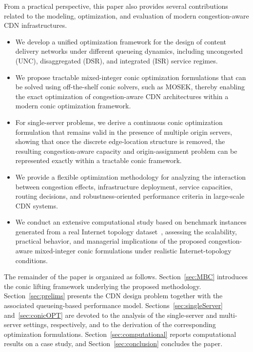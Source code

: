 \documentclass[a4paper,11pt,reqno]{amsart}
\begin{document}
From a practical perspective, this paper also provides several contributions related to the modeling, optimization, and evaluation of modern congestion-aware CDN infrastructures.

\begin{itemize}

\item[--] We develop a unified optimization framework for the design of content delivery networks under different queueing dynamics, including uncongested ({\rm UNC}), disaggregated ({\rm DSR}), and integrated ({\rm ISR}) service regimes.
\item[--] We propose tractable mixed-integer conic optimization formulations that can be solved using off-the-shelf conic solvers, such as \mbox{\rm MOSEK}, thereby enabling the exact optimization of congestion-aware CDN architectures within a modern conic optimization framework.
\item[--] For single-server problems, we derive a continuous conic optimization formulation that remains valid in the presence of multiple origin servers, showing that once the discrete edge-location structure is removed, the resulting congestion-aware capacity and origin-assignment problem can be represented exactly within a tractable conic framework.
\item[--] We provide a flexible optimization methodology for analyzing the interaction between congestion effects, infrastructure deployment, service capacities, routing decisions, and robustness-oriented performance criteria in large-scale CDN systems.
\item[--] We conduct an extensive computational study based on benchmark instances generated from a real Internet topology dataset~\citep{ITDK}, assessing the scalability, practical behavior, and managerial implications of the proposed congestion-aware mixed-integer conic formulations under realistic Internet-topology conditions.
\end{itemize}

The remainder of the paper is organized as follows.
Section~\ref{sec:MBC} introduces the conic lifting framework underlying the proposed methodology.
Section~\ref{sec:prelims} presents the CDN design problem together with the associated queueing-based performance model.
Sections~\ref{sec:singleServer} and~\ref{sec:conicOPT} are devoted to the analysis of the single-server and multi-server settings, respectively, and to the derivation of the corresponding optimization formulations.
Section~\ref{sec:computational} reports computational results on a case study, and Section~\ref{sec:conclusion} concludes the paper.
\end{document}
